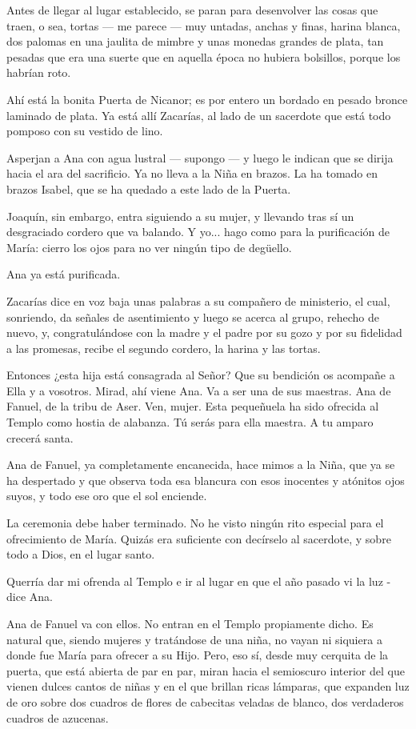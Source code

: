 \documentclass[12pt]{book} %
\begin{document}
Antes de llegar al lugar establecido, se paran para desenvolver las cosas que traen, o sea, tortas — me parece — muy untadas, anchas y finas, harina blanca, dos palomas en una jaulita de mimbre y unas monedas grandes de plata, tan pesadas que era una suerte que en aquella época no hubiera bolsillos, porque los habrían roto. 

Ahí está la bonita Puerta de Nicanor; es por entero un bordado en pesado bronce laminado de plata. Ya está allí Zacarías, al lado de un sacerdote que está todo pomposo con su vestido de lino. 

Asperjan a Ana con agua lustral — supongo — y luego le indican que se dirija hacia el ara del sacrificio. Ya no lleva a la Niña en brazos. La ha tomado en brazos Isabel, que se ha quedado a este lado de la Puerta. 

Joaquín, sin embargo, entra siguiendo a su mujer, y llevando tras sí un desgraciado cordero que va balando. Y yo... hago como para la purificación de María: cierro los ojos para no ver ningún tipo de degüello. 

Ana ya está purificada. 

Zacarías dice en voz baja unas palabras a su compañero de ministerio, el cual, sonriendo, da señales de asentimiento y luego se acerca al grupo, rehecho de nuevo, y, congratulándose con la madre y el padre por su gozo y por su fidelidad a las promesas, recibe el segundo cordero, la harina y las tortas. 

Entonces ¿esta hija está consagrada al Señor? Que su bendición os acompañe a Ella y a vosotros. Mirad, ahí viene Ana. Va a ser una de sus maestras. Ana de Fanuel, de la tribu de Aser. Ven, mujer. Esta pequeñuela ha sido ofrecida al Templo como hostia de alabanza. Tú serás para ella maestra. A tu amparo crecerá santa. 

Ana de Fanuel, ya completamente encanecida, hace mimos a la Niña, que ya se ha despertado y que observa toda esa blancura con esos inocentes y atónitos ojos suyos, y todo ese oro que el sol enciende. 

La ceremonia debe haber terminado. No he visto ningún rito especial para el ofrecimiento de María. Quizás era suficiente con decírselo al sacerdote, y sobre todo a Dios, en el lugar santo. 

Querría dar mi ofrenda al Templo e ir al lugar en que el año pasado vi la luz - dice Ana. 

Ana de Fanuel va con ellos. No entran en el Templo propiamente dicho. Es natural que, siendo mujeres y tratándose de una niña, no vayan ni siquiera a donde fue María para ofrecer a su Hijo. Pero, eso sí, desde muy cerquita de la puerta, que está abierta de par en par, miran hacia el semioscuro interior del que vienen dulces cantos de niñas y en el que brillan ricas lámparas, que expanden luz de oro sobre dos cuadros de flores de cabecitas veladas de blanco, dos verdaderos cuadros de azucenas. 
\end{document}
